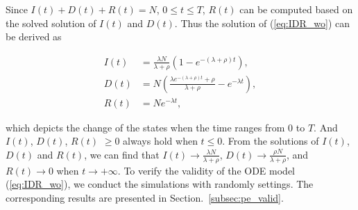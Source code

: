 Since $I(t)+D(t)+R(t)=N$, $0 \le t \le T$,
$R(t)$ can be computed based on the solved solution of $I(t)$ and $D(t)$.
Thus the solution of (\ref{eq:IDR_wo}) can be derived as
\begin{small}
\begin{equation}
\label{eq:IDR_wo_solu}
\begin{aligned}
I(t) &= \frac{ \lambda N }{ \lambda + \rho }(1- e^{-(\lambda + \rho)t}), \\
D(t) &= N (\frac{\lambda e^{-(\lambda + \rho)t} + \rho}{ \lambda + \rho } - e^{- \lambda t}), \\
R(t) &= N e^{- \lambda t},
\end{aligned}
\end{equation}
\end{small}
which depicts the change of the states when the time ranges from $0$ to $T$.
And $I(t)$, $D(t)$, $R(t)$ $\ge 0$ always hold when $t \le 0$.
From the solutions of $I(t)$, $D(t)$ and $R(t)$,
we can find that $I(t) \rightarrow \frac{ \lambda N }{ \lambda + \rho }$,
$D(t) \rightarrow \frac{ \rho N }{ \lambda + \rho }$,
and $R(t) \rightarrow 0$
when $t \rightarrow + \infty$.
To verify the validity of the ODE model (\ref{eq:IDR_wo}),
we conduct the simulations with randomly settings.
The corresponding results are presented in Section.~\ref{subsec:pe_valid}.

